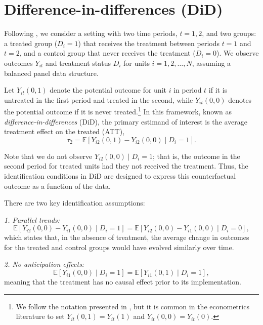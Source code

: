 \section{Difference-in-differences (DiD)}\label{sec12_5}

Following \cite{roth2023whats}, we consider a setting with two time periods, \( t = 1, 2 \), and two groups: a treated group (\( D_i = 1 \)) that receives the treatment between periods \( t = 1 \) and \( t = 2 \), and a control group that never receives the treatment (\( D_i = 0 \)). We observe outcomes \( Y_{it} \) and treatment status \( D_i \) for units \( i = 1, 2, \dots, N \), assuming a balanced panel data structure.

Let \( Y_{it}(0,1) \) denote the potential outcome for unit \( i \) in period \( t \) if it is untreated in the first period and treated in the second, while \( Y_{it}(0,0) \) denotes the potential outcome if it is never treated.\footnote{We follow the notation presented in \cite{imbens1997bayesian}, but it is common in the econometrics literature to set \( Y_{it}(0,1)=Y_{it}(1) \) and \( Y_{it}(0,0)=Y_{it}(0) \).} In this framework, known as \textit{difference-in-differences} (DiD), the primary estimand of interest is the average treatment effect on the treated (ATT),
\[
\tau_{2} = \mathbb{E}[Y_{i2}(0,1) - Y_{i2}(0,0) \mid D_i = 1].
\]

Note that we do not observe \( Y_{i2}(0,0) \mid D_i = 1 \); that is, the outcome in the second period for treated units had they not received the treatment. Thus, the identification conditions in DiD are designed to express this counterfactual outcome as a function of the data.

There are two key identification assumptions:

\textit{1. Parallel trends:}
\begin{equation}
	\mathbb{E}[Y_{i2}(0,0) - Y_{i1}(0,0) \mid D_i = 1] = \mathbb{E}[Y_{i2}(0,0) - Y_{i1}(0,0) \mid D_i = 0],
\end{equation}
which states that, in the absence of treatment, the average change in outcomes for the treated and control groups would have evolved similarly over time.

\textit{2. No anticipation effects:}
\begin{equation}
	\mathbb{E}[Y_{i1}(0,0)\mid D_i=1] = \mathbb{E}[Y_{i1}(0,1)\mid D_i=1],
\end{equation}
meaning that the treatment has no causal effect prior to its implementation.

